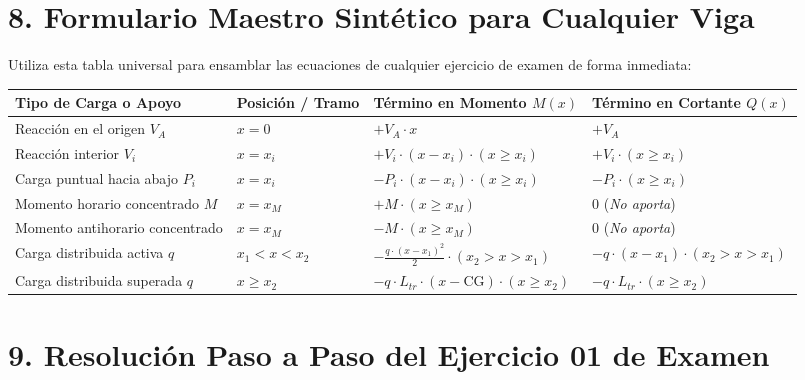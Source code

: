 \documentclass[10pt,a4paper]{article}
\begin{document}
\section{\color{NavyBlue}8. Formulario Maestro Sintético para Cualquier Viga}

Utiliza esta tabla universal para ensamblar las ecuaciones de cualquier ejercicio de examen de forma inmediata:

\begin{table}[h!]
\centering
\small
\renewcommand{\arraystretch}{1.3}
\begin{tabularx}{\textwidth}{p{3.8cm}p{3.2cm}p{4.6cm}X}
\toprule
\textbf{Tipo de Carga o Apoyo} & \textbf{Posición / Tramo} & \textbf{Término en Momento $M(x)$} & \textbf{Término en Cortante $Q(x)$} \\
\midrule
Reacción en el origen $V_A$ & $x = 0$ & $+ V_A \cdot x$ & $+ V_A$ \\
Reacción interior $V_i$ & $x = x_i$ & $+ V_i \cdot (x - x_i) \cdot (x \ge x_i)$ & $+ V_i \cdot (x \ge x_i)$ \\
Carga puntual hacia abajo $P_i$ & $x = x_i$ & $- P_i \cdot (x - x_i) \cdot (x \ge x_i)$ & $- P_i \cdot (x \ge x_i)$ \\
Momento horario concentrado $M$ & $x = x_M$ & $+ M \cdot (x \ge x_M)$ & $0$ \quad (\textit{No aporta}) \\
Momento antihorario concentrado & $x = x_M$ & $- M \cdot (x \ge x_M)$ & $0$ \quad (\textit{No aporta}) \\
Carga distribuida activa $q$ & $x_1 < x < x_2$ & $-\frac{q \cdot (x - x_1)^2}{2} \cdot (x_2 > x > x_1)$ & $- q \cdot (x - x_1) \cdot (x_2 > x > x_1)$ \\
Carga distribuida superada $q$ & $x \ge x_2$ & $- q \cdot L_{tr} \cdot \left(x - \text{CG}\right) \cdot (x \ge x_2)$ & $- q \cdot L_{tr} \cdot (x \ge x_2)$ \\
\bottomrule
\end{tabularx}
\end{table}

\vspace{6pt}

\section{\color{NavyBlue}9. Resolución Paso a Paso del Ejercicio 01 de Examen}
\end{document}
